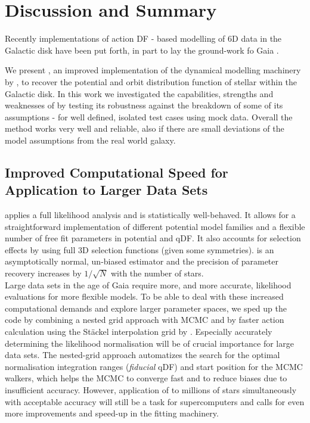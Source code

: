 \section{Discussion and Summary} \label{sec:discussionsummary}

Recently implementations of action DF - based modelling of 6D data in the Galactic disk have been put forth, in part to lay the ground-work fo Gaia \citep{bov13,2013MNRAS.433.1411M,2014MNRAS.445.3133P,2015MNRAS.449.3479S}.
 
 We present \RM, an improved implementation of the dynamical modelling machinery by \citet{bov13}, to recover the potential and orbit distribution function of stellar \MAPs{} within the Galactic disk. In this work we investigated the capabilities, strengths and weaknesses of \RM by testing its robustness against the breakdown of some of its assumptions - for well defined, isolated test cases using mock data. Overall the method works very well and reliable, also if there are small deviations of the model assumptions from the real world galaxy.

\subsection{Improved Computational Speed for Application to Larger Data Sets}

\RM{} applies a full likelihood analysis and is statistically well-behaved. It allows for a straightforward implementation of different potential model families and a flexible number of free fit parameters in potential and qDF. It also accounts for selection effects by using full 3D selection functions (given some symmetries). \RM{} is an asymptotically normal, un-biased estimator and the precision of parameter recovery increases by $1/\sqrt{N}$ with the number of stars.\\

Large data sets in the age of Gaia require more, and more accurate, likelihood evaluations for more flexible models. To be able to deal with these increased computational demands and explore larger parameter spaces, we sped up the code by combining a nested grid approach with MCMC and by faster action calculation using the St\"{a}ckel \citep{2012MNRAS.426.1324B} interpolation grid by \citet{bov15}. Especially accurately determining the likelihood normalisation will be of crucial importance for large data sets. The nested-grid approach automatizes the search for the optimal normalisation integration ranges (\emph{fiducial} qDF) and start position for the MCMC walkers, which helps the MCMC to converge fast and to reduce biases due to insufficient accuracy. However, application of \RM{} to millions of stars simultaneously with acceptable accuracy will still be a task for supercomputers and calls for even more improvements and speed-up in the fitting machinery.

